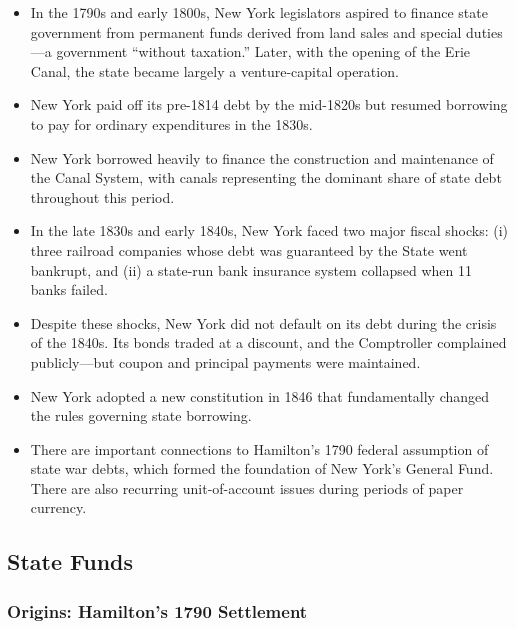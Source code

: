 \documentclass[11pt]{article}
\begin{document}
\begin{itemize}
\item In the 1790s and early 1800s, New York legislators aspired to finance
  state government from permanent funds derived from land sales and special
  duties---a government ``without taxation.''  Later, with the opening of the
  Erie Canal, the state became largely a venture-capital operation.

\item New York paid off its pre-1814 debt by the mid-1820s but resumed
  borrowing to pay for ordinary expenditures in the 1830s.

\item New York borrowed heavily to finance the construction and maintenance
  of the Canal System, with canals representing the dominant share of
  state debt throughout this period.

\item In the late 1830s and early 1840s, New York faced two major fiscal
  shocks: (i) three railroad companies whose debt was guaranteed by the State
  went bankrupt, and (ii) a state-run bank insurance system collapsed when 11
  banks failed.

\item Despite these shocks, New York did not default on its debt during the
  crisis of the 1840s.  Its bonds traded at a discount, and the Comptroller
  complained publicly---but coupon and principal payments were maintained.

\item New York adopted a new constitution in 1846 that fundamentally changed
  the rules governing state borrowing.

\item There are important connections to Hamilton's 1790 federal assumption of
  state war debts, which formed the foundation of New York's General Fund.
  There are also recurring unit-of-account issues during periods of paper
  currency.
\end{itemize}

\subsection{State Funds}
\label{sec:ny_funds}

\subsubsection{Origins: Hamilton's 1790 Settlement}
\end{document}
